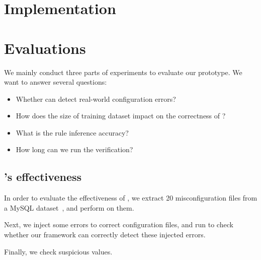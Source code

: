 
\section{Implementation}


\section{Evaluations}

We mainly conduct three parts of experiments to evaluate our \app
prototype. We want to answer several questions:

\begin{itemize}

\item Whether \app can detect real-world configuration errors?

\item How does the size of training dataset impact on the correctness
  of \app?

\item What is the rule inference accuracy?

\item How long can we run the verification?

\end{itemize}



\subsection{\app's effectiveness}

In order to evaluate the effectiveness of \app, we extract
20 misconfiguration files from a MySQL dataset~\cite{xu15hey},
and perform \app on them. 

Next, we inject some errors to correct configuration files,
and run \app to check whether our framework can correctly detect
these injected errors. 

Finally, we check suspicious values.

